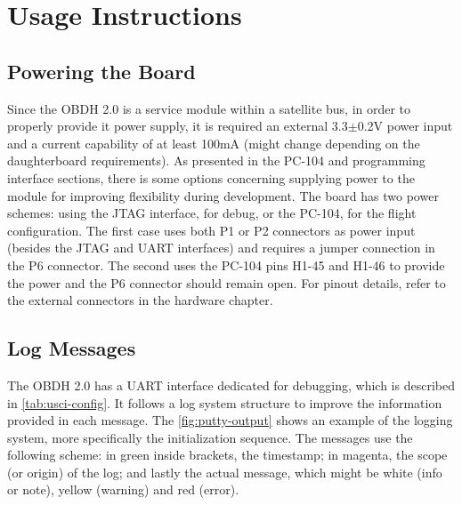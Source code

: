%
%
%
%
%

%
%
%
%
%
%

\chapter{Usage Instructions} \label{ch:instructions}

\section{Powering the Board}

Since the OBDH 2.0 is a service module within a satellite bus, in order to properly provide it power supply, it is required an external 3.3$\pm$0.2V power input and a current capability of at least 100mA (might change depending on the daughterboard requirements). As presented in the PC-104 and programming interface sections, there is some options concerning supplying power to the module for improving flexibility during development. The board has two power schemes: using the JTAG interface, for debug, or the PC-104, for the flight configuration. The first case uses both P1 or P2 connectors as power input (besides the JTAG and UART interfaces) and requires a jumper connection in the P6 connector. The second uses the PC-104 pins H1-45 and H1-46 to provide the power and the P6 connector should remain open. For pinout details, refer to the external connectors in the hardware chapter.

\section{Log Messages}

The OBDH 2.0 has a UART interface dedicated for debugging, which is described in \autoref{tab:usci-config}. It follows a log system structure to improve the information provided in each message. The \autoref{fig:putty-output} shows an example of the logging system, more specifically the initialization sequence. The messages use the following scheme: in green inside brackets, the timestamp; in magenta, the scope (or origin) of the log; and lastly the actual message, which might be white (info or note), yellow (warning) and red (error).  

